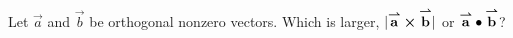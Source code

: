 \documentclass{ximera}
\begin{document}
\begin{problem}
  Let $\vec{a}$ and $\vec{b}$ be orthogonal nonzero vectors. Which is
  larger, $|\vec{a}\cross\vec{b}|$ or $\vec{a}\dotp\vec{b}$?
  \begin{prompt}
    \begin{multipleChoice}
    \end{multipleChoice}
  \end{prompt}
\end{problem}
\end{document}
